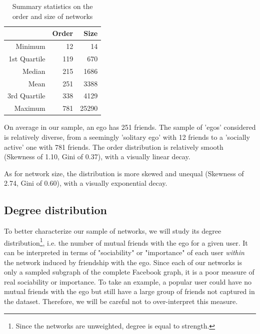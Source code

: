 \documentclass[11pt]{article}       %
\begin{document}
\begin{table}[ht]
\centering
\begin{tabular}{rrr}
  \hline
 & Order & Size \\ 
  \hline
Minimum & 12 & 14 \\ 
  1st Quartile & 119 & 670 \\ 
  Median & 215 & 1686 \\ 
  Mean & 251 & 3388 \\ 
  3rd Quartile & 338 & 4129 \\ 
  Maximum & 781 & 25290 \\ 
   \hline
\end{tabular}
\caption{Summary statistics on the order and size of networks}
\end{table}

On average in our sample, an ego has 251 friends. The sample of 'egos' considered is relatively diverse, from a seemingly 'solitary ego' with 12 friends to a 'socially active' one with 781 friends. The order distribution is relatively smooth (Skewness of 1.10, Gini of 0.37), with a visually linear decay.

As for network size, the distribution is more skewed and unequal (Skewness of 2.74, Gini of 0.60), with a visually exponential decay.

\newpage

\subsection{Degree distribution} \label{degreedistribution}

To better characterize our sample of networks, we will study its degree distribution\footnote{Since the networks are unweighted, degree is equal to strength.}, i.e. the number of mutual friends with the ego for a given user. It can be interpreted in terms of "sociability" or "importance" of each user \emph{within} the network induced by friendship with the ego. Since each of our networks is only a sampled subgraph of the complete Facebook graph, it is a poor measure of real sociability or importance. To take an example, a popular user could have no mutual friends with the ego but still have a large group of friends not captured in the dataset. Therefore, we will be careful not to over-interpret this measure.
\end{document}
